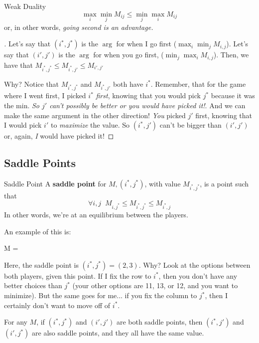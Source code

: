\begin{prop}{Weak Duality}{}
$$\max_i \min_j M_{ij} \leq \min_j \max_i M_{ij}$$ 
or, in other
words, \textit{going second is an advantage.}
\end{prop}

\begin{proof}[]
Let's say that $(i^*, j^*)$ is the $\arg$ for when I go first 
($\max_i \min_j M_{i,j}$). Let's say that $(i', j')$ is the $\arg$ for when you go first,
($\min_j \max_i M_{i,j}$). Then, we have that $M_{i^*, j^*} \leq M_{i^*, j'} 
	\leq M_{i', j'}$

Why? Notice that $M_{i^*, j^*}$ and $M_{i^*, j'}$ both have $i^*$. Remember, that
for the game where I went first, I picked $i^*$ \textit{first}, knowing that you
would pick $j^*$ because it was the min. \textit{So $j'$ can't possibly be better
or you would have picked it!}. And we can make the same argument in the other
direction! \textit{You} picked $j'$ first, knowing that I would pick $i'$ to
\textit{maximize} the value. So $(i^*, j')$ can't be bigger than $(i', j')$
or, again, \textit{I} would have picked it! 
\end{proof}

\subsection{Saddle Points}

\begin{defn}{Saddle Point}{}
A \textbf{saddle point} for $M, (i^*, j^*)$, with value
$M_{i^*,j^*}$,  is a point such that $$\forall i,j \;\; M_{i, j^*} \leq M_{i^*, j^*}
\leq M_{i^*, j}$$
In other words, we're at an equilibrium between the players.
\end{defn}

An example of this is:
\begin{frml}
	M = 
\end{frml}

Here, the saddle point is $(i^*, j^*) = (2, 3)$. Why? Look at the options between
both players, given this point. If I fix the row to $i^*$, then you don't have any
better choices than $j^*$ (your other options are 11, 13, or 12, and you want to
minimize). But the same goes for me... if you fix the column to $j^*$, then I certainly
don't want to move off of $i^*$.

\begin{prop}{}{}
For any $M$, if $(i^*, j^*)$ and $(i', j')$ are both saddle
points, then $(i^*, j')$ and $(i', j^*)$ are also saddle points, and they
all have the same value.
\end{prop}

